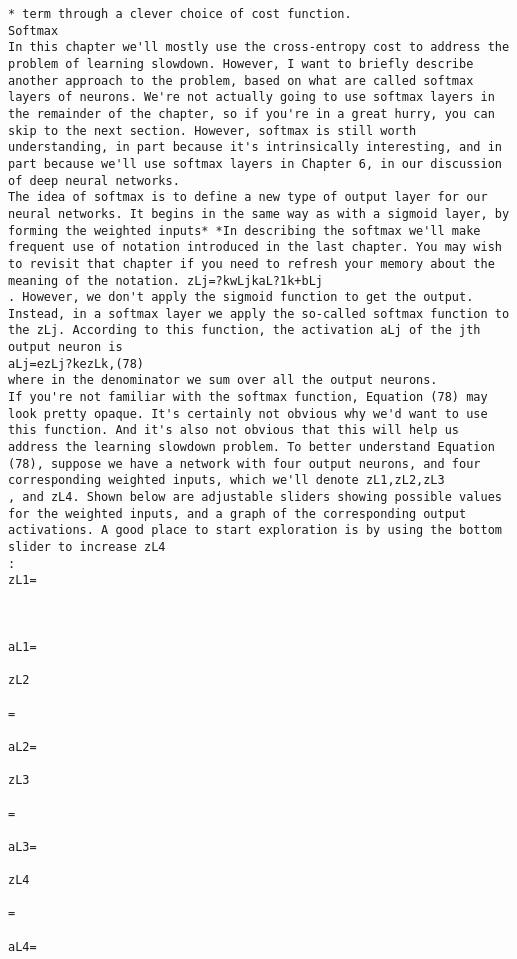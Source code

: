 \begin{lstlisting}
* term through a clever choice of cost function. 
Softmax
In this chapter we'll mostly use the cross-entropy cost to address the problem of learning slowdown. However, I want to briefly describe another approach to the problem, based on what are called softmax layers of neurons. We're not actually going to use softmax layers in the remainder of the chapter, so if you're in a great hurry, you can skip to the next section. However, softmax is still worth understanding, in part because it's intrinsically interesting, and in part because we'll use softmax layers in Chapter 6, in our discussion of deep neural networks.
The idea of softmax is to define a new type of output layer for our neural networks. It begins in the same way as with a sigmoid layer, by forming the weighted inputs* *In describing the softmax we'll make frequent use of notation introduced in the last chapter. You may wish to revisit that chapter if you need to refresh your memory about the meaning of the notation. zLj=?kwLjkaL?1k+bLj
. However, we don't apply the sigmoid function to get the output. Instead, in a softmax layer we apply the so-called softmax function to the zLj. According to this function, the activation aLj of the jth output neuron is 
aLj=ezLj?kezLk,(78)
where in the denominator we sum over all the output neurons.
If you're not familiar with the softmax function, Equation (78) may look pretty opaque. It's certainly not obvious why we'd want to use this function. And it's also not obvious that this will help us address the learning slowdown problem. To better understand Equation (78), suppose we have a network with four output neurons, and four corresponding weighted inputs, which we'll denote zL1,zL2,zL3
, and zL4. Shown below are adjustable sliders showing possible values for the weighted inputs, and a graph of the corresponding output activations. A good place to start exploration is by using the bottom slider to increase zL4
:
zL1=



aL1=

zL2

= 

aL2=

zL3

= 

aL3=

zL4

= 

aL4=


\end{lstlisting}

